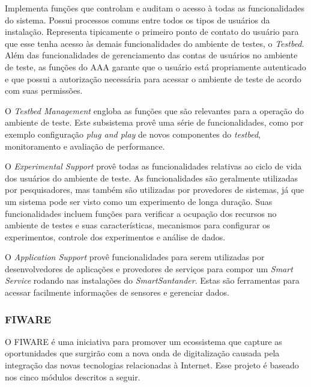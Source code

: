 Implementa funções que controlam e auditam o acesso à todas as funcionalidades do sistema. Possui processos
comuns entre todos os tipos de usuários da instalação. Representa tipicamente o primeiro ponto de contato
do usuário para que esse tenha acesso às demais funcionalidades do ambiente de testes, o \textit{Testbed}.
Além das funcionalidades de gerenciamento das contas de usuários no ambiente de teste, as funções
do AAA garante que o usuário está propriamente autenticado e que possui a autorização necessária para
acessar o ambiente de teste de acordo com suas permissões.

O \textit{Testbed Management} engloba as funções que são relevantes para a operação do ambiente de teste.
Este subsistema provê uma série de funcionalidades, como por exemplo configuração \textit{plug and play}
de novos componentes do \textit{testbed}, monitoramento e avaliação de performance.


O \textit{Experimental Support} provê todas as funcionalidades relativas ao ciclo de vida dos usuários
do ambiente de teste. As funcionalidades são geralmente utilizadas por pesquisadores, mas também são utilizadas por
provedores de sistemas, já que um sistema pode ser visto como um experimento de longa duração.
Suas funcionalidades incluem funções para verificar a ocupação dos recursos no ambiente de testes e suas características,
mecanismos para configurar os experimentos, controle dos experimentos e análise de dados.

O \textit{Application Support} provê funcionalidades para serem utilizadas por desenvolvedores de aplicações
e provedores de serviços para compor um \textit{Smart Service} rodando nas instalações do \textit{SmartSantander}.
Estas são ferramentas para acessar facilmente informações de sensores e gerenciar dados.

\subsubsection{FIWARE}
\label{subsec:FIWARE}
O FIWARE é uma iniciativa para promover um ecossistema que capture as oportunidades que surgirão com a nova onda
de digitalização causada pela integração das novas tecnologias relacionadas à Internet. Esse projeto é
baseado nos cinco módulos descritos a seguir.

